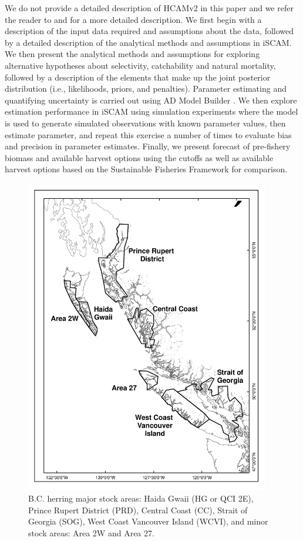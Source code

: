 We do not provide a detailed description of HCAMv2 in this paper and we refer the reader to \cite{schweigert2009stock} and \cite{Clear2010} for a more detailed description.  We first begin with a description of the input data required and assumptions about the data, followed by a detailed description of the analytical methods and assumptions in iSCAM. We then present the analytical methods and assumptions for exploring alternative hypotheses about selectivity, catchability and natural mortality, followed by a description of the elements that make up the joint posterior distribution (i.e., likelihoods, priors, and penalties).  Parameter estimating and quantifying uncertainty is carried out using AD Model Builder \citep{ADMB2009}.  We then explore estimation performance in iSCAM using simulation experiments where the model is used to generate simulated observations with known parameter values, then estimate parameter, and repeat this exercise a number of times to evaluate bias and precision in parameter estimates.  Finally, we present forecast of pre-fishery biomass and available harvest options using the cutoffs \cite[e.g., reproduce Table 5 in ][]{Clear2010} as well as available harvest options based on the Sustainable Fisheries Framework \citep[i.e.,][]{dfo2006} for comparison.

\begin{figure}[!tbp]
	\includegraphics[width=0.95\textwidth]{../FIGS/PBSfigs/Assessment_Regions_2W_27_2010_HG.pdf}
	\caption{B.C. herring major stock areas: Haida Gwaii (HG or QCI 2E), Prince Rupert District (PRD), Central
Coast (CC), Strait of Georgia (SOG), West Coast Vancouver Island (WCVI), and minor stock areas: Area 2W and
Area 27.}\label{Fig1}
\end{figure}
	
